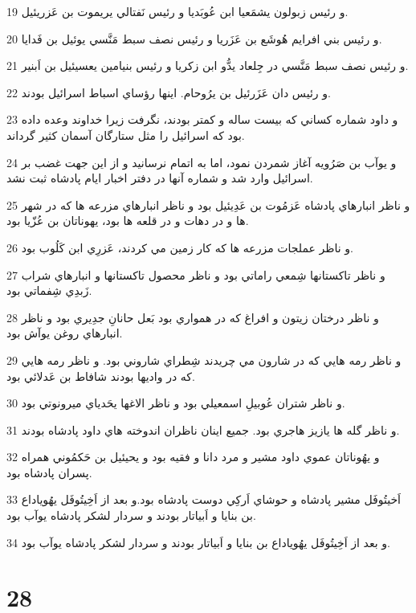 \par 19 و رئيس زبولون يشمَعيا ابن عُوبَديا و رئيس نَفتالي يريموت بن عَزريئيل.
\par 20 و رئيس بني افرايم هُوشَع بن عَزَريا و رئيس نصف سبط مَنَّسي يوئيل بن فَدايا.
\par 21 و رئيس نصف سبط مَنَّسي در جِلعاد يدُّو ابن زکريا و رئيس بنيامين يعسيئيل بن اَبنير.
\par 22 و رئيس دان عَزَرئيل بن يرُوحام. اينها رؤساي اسباط اسرائيل بودند.
\par 23 و داود شماره کساني که بيست ساله و کمتر بودند، نگرفت زيرا خداوند وعده داده بود که اسرائيل را مثل ستارگان آسمان کثير گرداند.
\par 24 و يوآب بن صَرُويه آغاز شمردن نمود، اما به اتمام نرسانيد و از اين جهت غضب بر اسرائيل وارد شد و شماره آنها در دفتر اخبار ايام پادشاه ثبت نشد.
\par 25 و ناظر انبارهاي پادشاه عَزمُوت بن عَدِيئيل بود و ناظر انبارهاي مزرعه ها که در شهر ها و در دهات و در قلعه ها بود، يهوناتان بن عُزّيا بود.
\par 26 و ناظر عملجات مزرعه ها که کار زمين مي کردند، عَزرِي ابن کَلُوب بود.
\par 27 و ناظر تاکستانها شِمعي راماتي بود و ناظر محصول تاکستانها و انبارهاي شراب زَبدِي شِفماتي بود.
\par 28 و ناظر درختان زيتون و افراغ که در همواري بود بَعل حانانِ جدِيري بود و ناظر انبارهاي روغن يوآش بود. 
\par 29 و ناظر رمه هايي که در شارون مي چريدند شِطراي شاروني بود. و ناظر رمه هايي که در واديها بودند شافاط بن عَدلائي بود.
\par 30 و ناظر شتران عُوبيلِ اسمعيلي بود و ناظر الاغها يحَدياي ميرونوتي بود.
\par 31 و ناظر گله ها يازيز هاجري بود. جميع اينان ناظران اندوخته هاي داود پادشاه بودند.
\par 32 و يهُوناتان عموي داود مشير و مرد دانا و فقيه بود و يحيئيل بن حَکمُوني همراه پسران پادشاه بود.
\par 33 اَخيتُوفَل مشير پادشاه و حوشاي اَرکِي دوست پادشاه بود.و بعد از اَخِيتُوفَل يهُوياداع بن بنايا و اَبياتار بودند و سردار لشکر پادشاه يوآب بود.
\par 34 و بعد از اَخِيتُوفَل يهُوياداع بن بنايا و اَبياتار بودند و سردار لشکر پادشاه يوآب بود.
 
\chapter{28}


